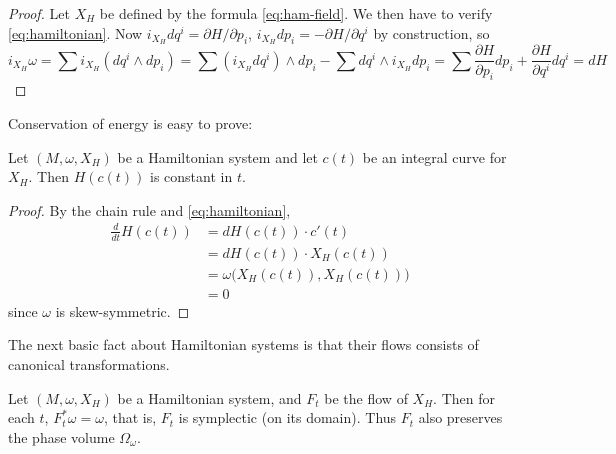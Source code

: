 \begin{proof}Let $X_H$ be defined by the formula \ref{eq:ham-field}. We then have to verify \ref{eq:hamiltonian}.
Now $i_{X_H} dq^i = \partial H/\partial p_i$, $i_{X_H} dp_i = -\partial H/\partial q^i$ by construction, so
\[
i_{X_H}\omega = \sum i_{X_H}(dq^i \wedge dp_i) = \sum (i_{X_H} dq^i) \wedge dp_i - \sum dq^i \wedge i_{X_H} dp_i = \sum \frac{\partial H}{\partial p_i} dp_i + \frac{\partial H}{\partial q^i} dq^i = dH 
\]
\end{proof}
\noindent Conservation of energy is easy to prove:

\begin{proposition}\label{prop:cons-energy}
	Let $(M,\omega,X_H)$ be a Hamiltonian system and let $c(t)$ be an integral curve for $X_H$. Then $H(c(t))$ is constant in $t$.
\end{proposition}
\begin{proof}
	By the chain rule and \ref{eq:hamiltonian},
\begin{align*}
	\frac{d}{dt} H(c(t)) &= dH(c(t)) \cdot c'(t) \\
	&= dH(c(t)) \cdot X_H(c(t)) \\
	&= \omega\big(X_H(c(t)), X_H(c(t))\big) \\
	&= 0
\end{align*}
since $\omega$ is skew-symmetric. 
\end{proof}

The next basic fact about Hamiltonian systems is that their flows consists of canonical transformations.

\begin{proposition}\label{thm:liouville}
	Let $(M,\omega,X_H)$ be a Hamiltonian system, and $F_t$ be the flow of $X_H$. Then for each $t$, $F_t^*\omega = \omega$, that is, $F_t$ is symplectic (on its domain). Thus $F_t$ also preserves the phase volume $\Omega_\omega$.
\end{proposition}


\printbibliography


